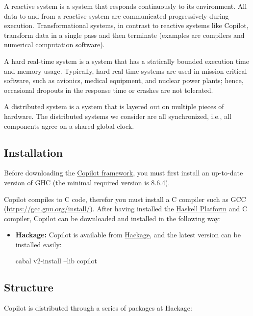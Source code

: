 A reactive system is a system that responds continuously to its environment.
%
All data to and from a reactive system are communicated progressively during
execution.
%
Transformational systems, in contrast to reactive systems like Copilot,
transform data in a single pass and then terminate (examples are compilers and
numerical computation software).
%

A hard real-time system is a system that has a statically bounded execution
time and memory usage.
%
 Typically, hard real-time systems are used in mission-critical software, such
as avionics, medical equipment, and nuclear power plants; hence, occasional
dropouts in the response time or crashes are not tolerated.

A distributed system is a system that is layered out on multiple pieces of
hardware.
%
The distributed systems we consider are all synchronized, i.e., all components
agree on a shared global clock.


\subsection{Installation} \label{sec:install}

Before downloading the \href{https://github.com/Copilot-Language}{Copilot framework}, you must first install an
up-to-date version of GHC (the minimal required version is 8.6.4).
%

\noindent Copilot compiles to C code, therefor you must install a C compiler
such as GCC (\url{https://gcc.gnu.org/install/}). After having installed the
\href{https://www.haskell.org/}{Haskell Platform} and C compiler, Copilot can
be downloaded and installed in the following way:

\begin{itemize}
\item \textbf{Hackage: } Copilot is available from
\href{https://hackage.haskell.org/package/copilot-3.16#table-of-contents}{Hackage},
and the latest version can be installed easily:
\begin{code}
cabal v2-install --lib copilot
\end{code}

\end{itemize}


\subsection{Structure} \label{structure}

\noindent Copilot is distributed through a series of packages at Hackage:


